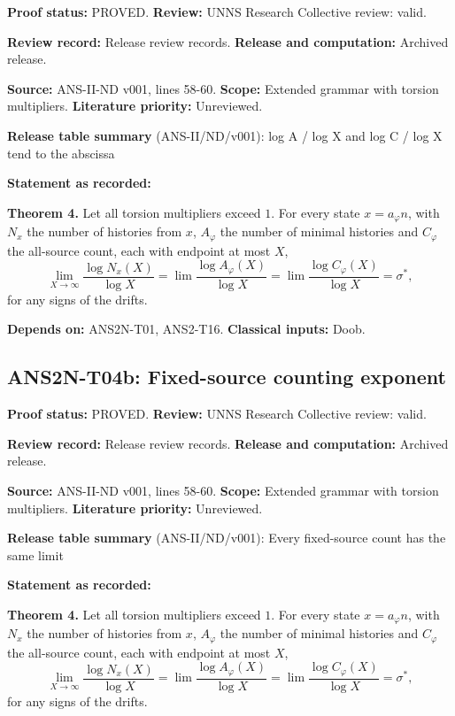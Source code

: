 \documentclass[
  11pt,
]{article}
\begin{document}
\textbf{Proof status:} PROVED. \textbf{Review:} UNNS Research Collective
review: valid.

\textbf{Review record:} Release review records. \textbf{Release and
computation:} Archived release.

\textbf{Source:} ANS-II-ND v001, lines 58-60. \textbf{Scope:} Extended
grammar with torsion multipliers. \textbf{Literature priority:}
Unreviewed.

\textbf{Release table summary} (ANS-II/ND/v001): log A / log X and log C
/ log X tend to the abscissa

\textbf{Statement as recorded:}

\textbf{Theorem 4.} Let all torsion multipliers exceed \(1\). For every
state \(x=a_\varphi n\), with \(N_x\) the number of histories from
\(x\), \(A_\varphi\) the number of minimal histories and \(C_\varphi\)
the all-source count, each with endpoint at most \(X\),
\[\lim_{X\to\infty}\frac{\log N_x(X)}{\log X}=\lim\frac{\log A_\varphi(X)}{\log X}=\lim\frac{\log C_\varphi(X)}{\log X}=\sigma^\ast,\]
for any signs of the drifts.

\textbf{Depends on:} ANS2N-T01, ANS2-T16. \textbf{Classical inputs:}
Doob.

\hypertarget{ans2n-t04b-fixed-source-counting-exponent}{%
\subsection{ANS2N-T04b: Fixed-source counting
exponent}\label{ans2n-t04b-fixed-source-counting-exponent}}

\textbf{Proof status:} PROVED. \textbf{Review:} UNNS Research Collective
review: valid.

\textbf{Review record:} Release review records. \textbf{Release and
computation:} Archived release.

\textbf{Source:} ANS-II-ND v001, lines 58-60. \textbf{Scope:} Extended
grammar with torsion multipliers. \textbf{Literature priority:}
Unreviewed.

\textbf{Release table summary} (ANS-II/ND/v001): Every fixed-source
count has the same limit

\textbf{Statement as recorded:}

\textbf{Theorem 4.} Let all torsion multipliers exceed \(1\). For every
state \(x=a_\varphi n\), with \(N_x\) the number of histories from
\(x\), \(A_\varphi\) the number of minimal histories and \(C_\varphi\)
the all-source count, each with endpoint at most \(X\),
\[\lim_{X\to\infty}\frac{\log N_x(X)}{\log X}=\lim\frac{\log A_\varphi(X)}{\log X}=\lim\frac{\log C_\varphi(X)}{\log X}=\sigma^\ast,\]
for any signs of the drifts.
\end{document}

